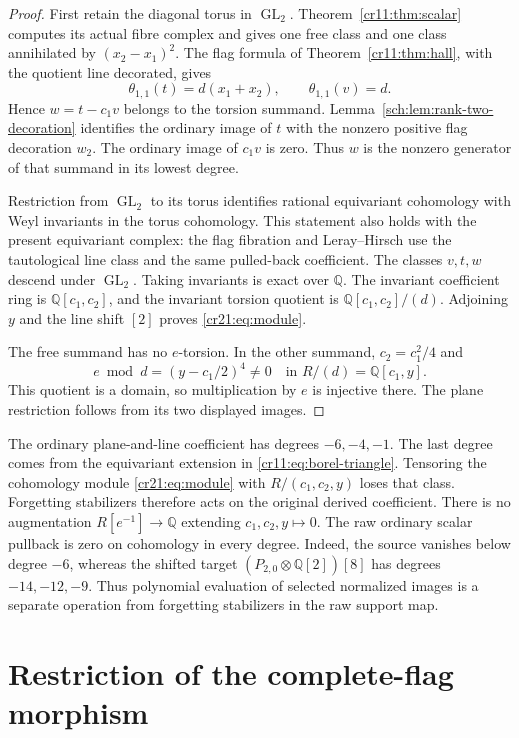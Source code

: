 \begin{proof}
First retain the diagonal torus in $\operatorname{GL}_2$.
Theorem~\ref{cr11:thm:scalar} computes its actual fibre complex and gives
one free class and one class annihilated by $(x_2-x_1)^2$.
The flag formula of Theorem~\ref{cr11:thm:hall}, with the quotient
line decorated, gives
\[
 \theta_{1,1}(t)=d(x_1+x_2),\qquad
 \theta_{1,1}(v)=d.
\]
Hence $w=t-c_1v$ belongs to the torsion summand.
Lemma~\ref{sch:lem:rank-two-decoration} identifies the ordinary image
of $t$ with the nonzero positive flag decoration $w_2$.
The ordinary image of $c_1v$ is zero.
Thus $w$ is the nonzero generator of that summand in its lowest degree.

Restriction from $\operatorname{GL}_2$ to its torus identifies rational
equivariant cohomology with Weyl invariants in the torus cohomology.
This statement also holds with the present equivariant complex:
the flag fibration and Leray--Hirsch use the tautological line class
and the same pulled-back coefficient.
The classes $v,t,w$ descend under $\operatorname{GL}_2$.
Taking invariants is exact over $\mathbb Q$.
The invariant coefficient ring is $\mathbb Q[c_1,c_2]$, and the
invariant torsion quotient is $\mathbb Q[c_1,c_2]/(d)$.
Adjoining $y$ and the line shift $[2]$ proves \eqref{cr21:eq:module}.

The free summand has no $e$-torsion.
In the other summand, $c_2=c_1^2/4$ and
\[
 e\bmod d=(y-c_1/2)^4\ne0
       \quad\text{in }R/(d)=\mathbb Q[c_1,y].
\]
This quotient is a domain, so multiplication by $e$ is injective there.
The plane restriction follows from its two displayed images.
\end{proof}

The ordinary plane-and-line coefficient has degrees $-6,-4,-1$.
The last degree comes from the equivariant extension in
\eqref{cr11:eq:borel-triangle}.
Tensoring the cohomology module \eqref{cr21:eq:module} with
$R/(c_1,c_2,y)$ loses that class.
Forgetting stabilizers therefore acts on the original derived coefficient.
There is no augmentation $R[e^{-1}]\to\mathbb Q$ extending
$c_1,c_2,y\mapsto0$.
The raw ordinary scalar pullback is zero on cohomology in every degree.
Indeed, the source vanishes below degree $-6$, whereas the shifted
target $(P_{2,0}\otimes\mathbb Q[2])[8]$ has degrees $-14,-12,-9$.
Thus polynomial evaluation of selected normalized images is a separate
operation from forgetting stabilizers in the raw support map.

\section{Restriction of the complete-flag morphism}
\label{cr21:sec:flags}

